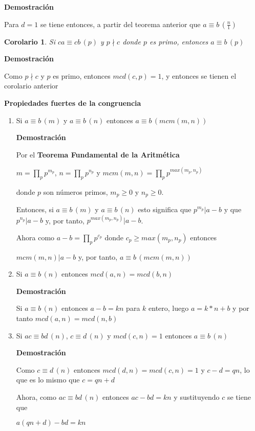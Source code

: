 \documentclass[a4paper,12pt]{report}
\newtheorem*{cor}{Corolario}
\begin{document}
\textbf{Demostración}

Para $d=1$ se tiene entonces, a partir del teorema anterior que $a\equiv b \, (\frac{n}{1})$

\begin{cor}
 Si $ca \equiv cb \, (p)$ y $p\nmid c$ donde $p$ es primo, entonces $a \equiv b \, (p)$
\end{cor}

\textbf{Demostración}

Como $p\nmid c$ y $p$ es primo, entonces $mcd(c,p)=1$, y entonces se tienen el corolario anterior


\textbf{Propiedades fuertes de la congruencia}
\begin{enumerate}
 \item Si $a \equiv b \, (m)$ y $a \equiv b \, (n)$ entonces $a \equiv b \, (mcm(m,n))$
 
 \textbf{Demostración}
 
 Por el \textbf{Teorema Fundamental de la Aritmética} 
 
 $m=\prod_pp^{m_p}$, $n=\prod_pp^{n_p}$ y $mcm(m,n)=\prod_pp^{max(m_p,n_p)}$
 
 donde $p$ son números primos, $m_p\geq 0$ y $n_p\geq 0$.
 
 Entonces, si $a \equiv b \, (m)$ y $a \equiv b \, (n)$ esto significa que $p^{m_p}|a-b$ y que $p^{n_p}|a-b$ y, por tanto, $p^{max(m_p,n_p)}|a-b$.
 
 Ahora como $a-b=\prod_pp^{c_p}$ donde $c_p\geq max(m_p,n_p)$ entonces 
 
 $mcm(m,n)|a-b$ y, por tanto, 
 $a\equiv b \, (mcm(m,n))$
 
 \item Si $a \equiv b \, (n)$ entonces $mcd(a,n)=mcd(b,n)$
 
  \textbf{Demostración}
  
  Si $a \equiv b \, (n)$ entonces $a-b=kn$ para $k$ entero, luego $a=k*n+b$ y por tanto $mcd(a,n)=mcd(n,b)$
 
 \item Si $ac \equiv bd \, (n)$, $c \equiv d \, (n)$ y $mcd(c,n)=1$ entonces $a \equiv b \, (n)$
 
 \textbf{Demostración}
 
 Como $c \equiv d \, (n)$ entonces $mcd(d,n)=mcd(c,n)=1$ y  $c-d=qn$, lo que es lo mismo que $c=qn+d$
 
 Ahora, como $ac \equiv bd \, (n)$ entonces $ac-bd=kn$ y sustituyendo $c$ se tiene que 
 
 $a(qn+d)-bd=kn$
 

\end{enumerate}
\end{document}
